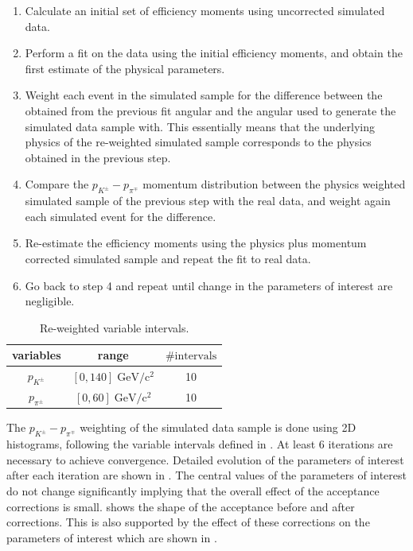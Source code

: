\begin{enumerate}
\item Calculate an initial set of efficiency moments using uncorrected \BsJpsiKst simulated data.
\item Perform a fit on the \BsJpsiKst data using the initial efficiency moments, and obtain the first estimate of the physical parameters.
\item Weight each event in the simulated sample for the difference between the obtained from the previous fit angular \pdf and the angular \pdf used to
      generate the simulated data sample with.
      This essentially means that the underlying physics of the re-weighted simulated  sample corresponds to the physics obtained in the previous step.
\item Compare the $p_{K^{\pm}}-p_{\pi^{\mp}}$ momentum distribution between the physics weighted simulated sample of the previous step with the
      real data, and weight again each simulated event for the difference.
\item Re-estimate the efficiency moments using the physics plus momentum corrected \BsJpsiKst simulated sample and repeat the fit to \BsJpsiKst real data.
\item Go back to step 4 and repeat until change in the parameters of interest are negligible.
\end{enumerate}

\begin{table}[!h]
  \center
  \begin{tabular}{c c c}
    \hline
     variables & range & $\# \text{intervals}$ \\
    \hline
    $p_{K^{\pm}}$    &  $[0,140]    \;  \text{GeV}/\text{c}^2$  & 10      \\
    $p_{\pi^{\pm}}$  &  $[0,60]      \;  \text{GeV}/\text{c}^2$  & 10      \\
    \hline
  \end{tabular}
  \caption{\small Re-weighted variable intervals.}
  \label{angAccBinning}
\end{table}

The $p_{K^{\pm}}-p_{\pi^{\mp}}$ weighting of the simulated data sample is done using 2D histograms, following the variable intervals defined in .
At least 6 iterations are necessary to achieve convergence. Detailed evolution of the parameters of interest after each iteration are shown in
. The central values of the parameters of interest do not change significantly implying that the overall effect of the
acceptance corrections is small.  shows the shape of the acceptance before and after corrections.
This is also supported by the effect of these corrections on the parameters of interest which are shown in .

